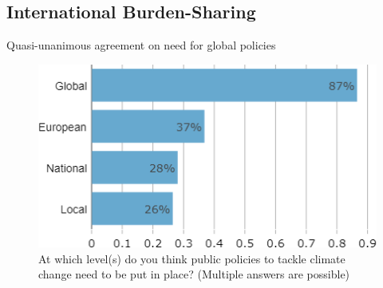 \begin{framefont}{\small}
\subsection{International Burden-Sharing}


\begin{frame}{Quasi-unanimous agreement on need for global policies}%
\vspace{-1cm}
\begin{figure}[h!]
\centering
\caption{\small{At which level(s) do you think public policies to tackle climate change need to be put in place? (Multiple answers are possible)}}
\includegraphics[width=.43\paperwidth]{../figures/FR/scale_FR.png}
\end{figure}
\end{frame}


\end{framefont}
